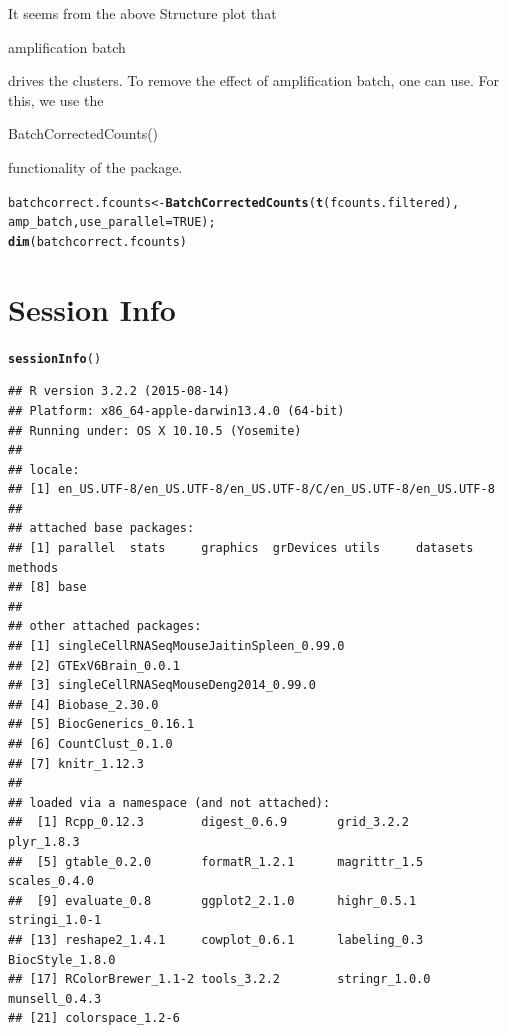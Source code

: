 \documentclass[12pt]{article}\usepackage[]{graphicx}\usepackage[usenames,dvipsnames]{color}
\makeatletter
\newcommand{\hlnum}[1]{\textcolor[rgb]{0.686,0.059,0.569}{#1}}%
\newcommand{\hlstd}[1]{\textcolor[rgb]{0.345,0.345,0.345}{#1}}%
\newcommand{\hlkwb}[1]{\textcolor[rgb]{0.69,0.353,0.396}{#1}}%
\newcommand{\hlkwc}[1]{\textcolor[rgb]{0.333,0.667,0.333}{#1}}%
\newcommand{\hlkwd}[1]{\textcolor[rgb]{0.737,0.353,0.396}{\textbf{#1}}}%
\newenvironment{kframe}{%
 \def\at@end@of@kframe{}%
 \ifinner\ifhmode%
  \def\at@end@of@kframe{\end{minipage}}%
  \begin{minipage}{\columnwidth}%
 \fi\fi%
 \def\FrameCommand##1{\hskip\@totalleftmargin \hskip-\fboxsep
 \colorbox{shadecolor}{##1}\hskip-\fboxsep
     \hskip-\linewidth \hskip-\@totalleftmargin \hskip\columnwidth}%
 \MakeFramed {\advance\hsize-\width
   \@totalleftmargin\z@ \linewidth\hsize
   \@setminipage}}%
 {\par\unskip\endMakeFramed%
 \at@end@of@kframe}
\newenvironment{knitrout}{}{} %
\makeatother
\begin{document}
It seems from the above Structure plot that \begin{verb} amplification batch \end{verb} drives the clusters. To remove the effect of amplification batch, one can use. For this, we use the \begin{verb} BatchCorrectedCounts() \end{verb} functionality of the package.

\clearpage

\begin{knitrout}
\color{fgcolor}\begin{kframe}
\begin{alltt}
\hlstd{batchcorrect.fcounts} \hlkwb{<-} \hlkwd{BatchCorrectedCounts}\hlstd{(}\hlkwd{t}\hlstd{(fcounts.filtered),}
                                             \hlstd{amp_batch,} \hlkwc{use_parallel} \hlstd{=} \hlnum{TRUE}\hlstd{);}
\hlkwd{dim}\hlstd{(batchcorrect.fcounts)}
\end{alltt}
\end{kframe}
\end{knitrout}


\section{Session Info}

\begin{knitrout}
\color{fgcolor}\begin{kframe}
\begin{alltt}
\hlkwd{sessionInfo}\hlstd{()}
\end{alltt}
\begin{verbatim}
## R version 3.2.2 (2015-08-14)
## Platform: x86_64-apple-darwin13.4.0 (64-bit)
## Running under: OS X 10.10.5 (Yosemite)
## 
## locale:
## [1] en_US.UTF-8/en_US.UTF-8/en_US.UTF-8/C/en_US.UTF-8/en_US.UTF-8
## 
## attached base packages:
## [1] parallel  stats     graphics  grDevices utils     datasets  methods  
## [8] base     
## 
## other attached packages:
## [1] singleCellRNASeqMouseJaitinSpleen_0.99.0
## [2] GTExV6Brain_0.0.1                       
## [3] singleCellRNASeqMouseDeng2014_0.99.0    
## [4] Biobase_2.30.0                          
## [5] BiocGenerics_0.16.1                     
## [6] CountClust_0.1.0                        
## [7] knitr_1.12.3                            
## 
## loaded via a namespace (and not attached):
##  [1] Rcpp_0.12.3        digest_0.6.9       grid_3.2.2         plyr_1.8.3        
##  [5] gtable_0.2.0       formatR_1.2.1      magrittr_1.5       scales_0.4.0      
##  [9] evaluate_0.8       ggplot2_2.1.0      highr_0.5.1        stringi_1.0-1     
## [13] reshape2_1.4.1     cowplot_0.6.1      labeling_0.3       BiocStyle_1.8.0   
## [17] RColorBrewer_1.1-2 tools_3.2.2        stringr_1.0.0      munsell_0.4.3     
## [21] colorspace_1.2-6
\end{verbatim}
\end{kframe}
\end{knitrout}
\end{document}
